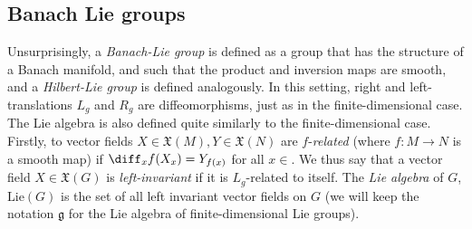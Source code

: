 


\subsection{Banach Lie groups}
Unsurprisingly, a \textit{Banach-Lie group} is defined as a group that has the structure of a Banach manifold, and such that the product and inversion maps are smooth, and a \textit{Hilbert-Lie group} is defined analogously. In this setting, right and left-translations \(L_g\) and \(R_g\) are diffeomorphisms, just as in the finite-dimensional case. The Lie algebra is also defined quite similarly to the finite-dimensional case. Firstly, to vector fields \(X \in \mathfrak{X}(M), Y \in \mathfrak{X}(N)\) are \(f\)-\textit{related} (where \(f\colon M \to N\) is a smooth map) if \(\diff_xf(X_x)=Y_{f(x)}\) for all \(x \in \). We thus say that a vector field \(X \in \mathfrak{X}(G)\) is \textit{left-invariant} if it is \(L_g\)-related to itself. The \textit{Lie algebra} of \(G\), \(\mathrm{Lie}(G)\) is the set of all left invariant vector fields on \(G\) (we will keep the notation \(\mathfrak{g}\) for the Lie algebra of finite-dimensional Lie groups).

